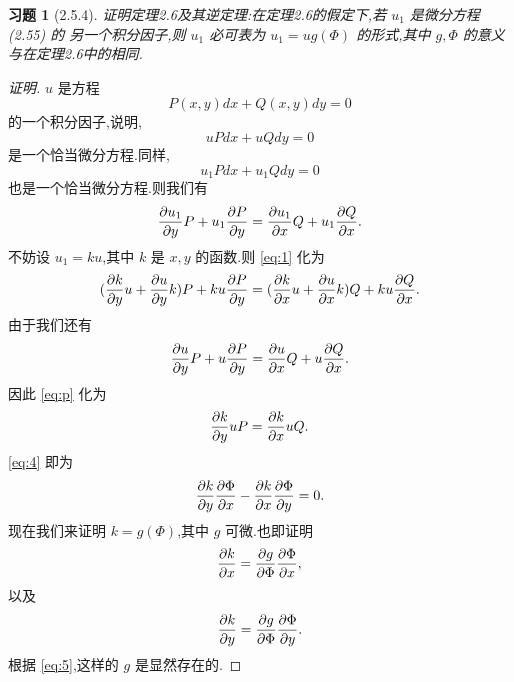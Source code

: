 \documentclass[a4paper, 12pt]{article} %
\newtheorem*{cdtheorem}{习题}
\newenvironment{exercise}
{\bigskip\begin{mdframed}[backgroundcolor=gray!40,rightline=false,leftline=false,topline=false,bottomline=false]\begin{cdtheorem}}
    {\end{cdtheorem}\end{mdframed}\bigskip}
\begin{document}
\begin{CJK}{UTF8}{gkai}
  \begin{exercise}[2.5.4]
证明定理2.6及其逆定理:在定理2.6的假定下,若 $u_1$ 是微分方程 (2.55) 的
另一个积分因子,则 $u_1$ 必可表为 $u_1=ug(\Phi)$ 的形式,其中 $g,\Phi$
的意义与在定理2.6中的相同.    
  \end{exercise}
  \begin{proof}[证明]
$u$ 是方程
$$
P(x,y)dx+Q(x,y)dy=0
$$
的一个积分因子,说明,
$$
uPdx+uQdy=0
$$
是一个恰当微分方程.同样,
$$
u_1Pdx+u_1Qdy=0
$$
也是一个恰当微分方程.则我们有
\begin{equation}
  \label{eq:1}
    \frac{\partial u_{1}}{\partial y}P+u_{1} \frac{\partial P}{\partial y}=\frac{\partial u_{1}}{\partial x}Q+u_{1}
\frac{\partial Q}{\partial x}.
\end{equation}
不妨设 $u_1=ku$,其中 $k$ 是 $x,y$ 的函数.则 \eqref{eq:1} 化为
\begin{equation}
  \label{eq:p}
  (\frac{\partial k}{\partial y}u+\frac{\partial u}{\partial y}k)P+ku \frac{\partial P}{\partial
  y}=(\frac{\partial k}{\partial x}u+\frac{\partial u}{\partial x}k)Q+ku \frac{\partial Q}{\partial x}.
\end{equation}
由于我们还有
\begin{equation}
  \label{eq:2}
    \frac{\partial u}{\partial y}P+u \frac{\partial P}{\partial y}=\frac{\partial u}{\partial x}Q+u
\frac{\partial Q}{\partial x}.
\end{equation}
因此 \eqref{eq:p} 化为
\begin{equation}
  \label{eq:4}
  \frac{\partial k}{\partial y}uP=\frac{\partial k}{\partial x}uQ.
\end{equation}
\eqref{eq:4} 即为
\begin{equation}
  \label{eq:5}
  \frac{\partial k}{\partial y}\frac{\partial \Phi}{\partial x}-\frac{\partial k}{\partial
    x}\frac{\partial \Phi}{\partial y}=0.
\end{equation}
现在我们来证明 $k=g(\Phi)$,其中 $g$ 可微.也即证明
$$
\frac{\partial k}{\partial x}=\frac{\partial g}{\partial\Phi}\frac{\partial\Phi}{\partial x},
$$
以及
$$
\frac{\partial k}{\partial y}=\frac{\partial g}{\partial\Phi}\frac{\partial \Phi}{\partial y}.
$$
根据 \eqref{eq:5},这样的 $g$ 是显然存在的.
\begin{comment}

即
\begin{equation}
  \label{eq:1}
  \frac{\pa u}{\pa y}P+u \frac{\pa P}{\pa y}=\frac{\pa u}{\pa x}Q+u
\frac{\pa Q}{\pa x}.
\end{equation}
同理,我有们
\begin{equation}
  \label{eq:2}
  \frac{\pa u_{1}}{\pa y}P+u_{1} \frac{\pa P}{\pa y}=\frac{\pa u_{1}}{\pa x}Q+u_{1}
\frac{\pa Q}{\pa x}.
\end{equation}


\end{comment}
\end{proof}
\end{CJK}
\end{document}
